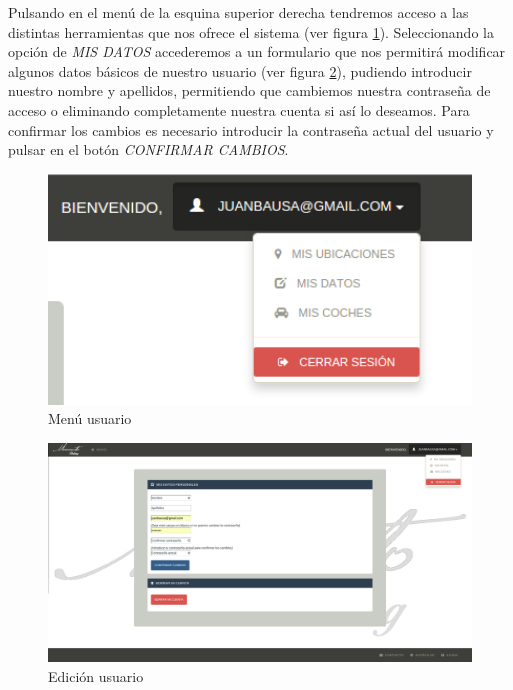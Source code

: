 Pulsando en el menú de la esquina superior derecha tendremos acceso a las distintas herramientas que nos ofrece el sistema (ver figura \ref{fig:lateral-menu}). Seleccionando la opción de \textit{MIS DATOS} accederemos a un formulario que nos permitirá modificar algunos datos básicos de nuestro usuario (ver figura \ref{fig:edit-user}), pudiendo introducir nuestro nombre y apellidos, permitiendo que cambiemos nuestra contraseña de acceso o eliminando completamente nuestra cuenta si así lo deseamos. Para confirmar los cambios es necesario introducir la contraseña actual del usuario y pulsar en el botón \textit{CONFIRMAR CAMBIOS}.

	\begin{figure}[h!]
		\centering
		\includegraphics[width=15cm, fbox={\fboxrule} 4mm]{images/06-manual/05-lateral_menu.png}
		\caption{Menú usuario}
		\label{fig:lateral-menu}
	\end{figure}

	\begin{figure}[h!]
		\centering
		\includegraphics[width=15cm, fbox={\fboxrule} 4mm]{images/06-manual/06-edit_user.png}
		\caption{Edición usuario}
		\label{fig:edit-user}
	\end{figure}

